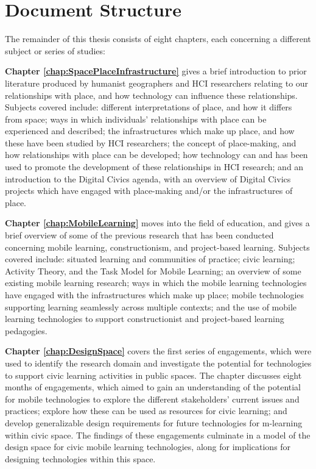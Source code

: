 \section{Document Structure}

The remainder of this thesis consists of eight chapters, each concerning a different subject or series of studies: 

\textbf{Chapter \ref{chap:SpacePlaceInfrastructure}} gives a brief introduction to prior literature produced by humanist geographers and HCI researchers relating to our relationships with place, and how technology can influence these relationships. Subjects covered include: different interpretations of place, and how it differs from space; ways in which individuals' relationships with place can be experienced and described; the infrastructures which make up place, and how these have been studied by HCI researchers; the concept of place-making, and how relationships with place can be developed; how technology can and has been used to promote the development of these relationships in HCI research; and an introduction to the Digital Civics agenda, with an overview of Digital Civics projects which have engaged with place-making and/or the infrastructures of place.

\textbf{Chapter \ref{chap:MobileLearning}} moves into the field of education, and gives a brief overview of some of the previous research that has been conducted concerning mobile learning, constructionism, and project-based learning. Subjects covered include: situated learning and communities of practice; civic learning; Activity Theory, and the Task Model for Mobile Learning; an overview of some existing mobile learning research; ways in which the mobile learning technologies have engaged with the infrastructures which make up place; mobile technologies supporting learning seamlessly across multiple contexts; and the use of mobile learning technologies to support constructionist and project-based learning pedagogies.

\textbf{Chapter \ref{chap:DesignSpace}} covers the first series of engagements, which were used to identify the research domain and investigate the potential for technologies to support civic learning activities in public spaces. The chapter discusses eight months of engagements, which aimed to gain an understanding of the potential for mobile technologies to explore the different stakeholders’ current issues and practices; explore how these can be used as resources for civic learning; and develop generalizable design requirements for future technologies for m-learning within civic space. The findings of these engagements culminate in a model of the design space for civic mobile learning technologies, along for implications for designing technologies within this space.

